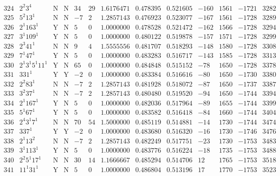 \documentclass[11pt,reqno,a4letter]{article}
\numberwithin{equation}{section}
\numberwithin{figure}{section}
\numberwithin{table}{section}
\theoremstyle{plain}
\numberwithin{theorem}{section}
\theoremstyle{definition}
\begin{document}
\begin{table}[ht]
\begin{equation*}
{\begin{array}{cc|cc|ccc|cc|cccc}
 324 & 2^2 3^4 & \text{N} & \text{N} & 34 & 29 & 1.6176471 & 0.478395 & 0.521605 & -160 & 1561 & -1721 & 3282 \\
 325 & 5^2 13^1 & \text{N} & \text{N} & -7 & 2 & 1.2857143 & 0.476923 & 0.523077 & -167 & 1561 & -1728 & 3289 \\
 326 & 2^1 163^1 & \text{Y} & \text{N} & 5 & 0 & 1.0000000 & 0.478528 & 0.521472 & -162 & 1566 & -1728 & 3294 \\
 327 & 3^1 109^1 & \text{Y} & \text{N} & 5 & 0 & 1.0000000 & 0.480122 & 0.519878 & -157 & 1571 & -1728 & 3299 \\
 328 & 2^3 41^1 & \text{N} & \text{N} & 9 & 4 & 1.5555556 & 0.481707 & 0.518293 & -148 & 1580 & -1728 & 3308 \\
 329 & 7^1 47^1 & \text{Y} & \text{N} & 5 & 0 & 1.0000000 & 0.483283 & 0.516717 & -143 & 1585 & -1728 & 3313 \\
 330 & 2^1 3^1 5^1 11^1 & \text{Y} & \text{N} & 65 & 0 & 1.0000000 & 0.484848 & 0.515152 & -78 & 1650 & -1728 & 3378 \\
 331 & 331^1 & \text{Y} & \text{Y} & -2 & 0 & 1.0000000 & 0.483384 & 0.516616 & -80 & 1650 & -1730 & 3380 \\
 332 & 2^2 83^1 & \text{N} & \text{N} & -7 & 2 & 1.2857143 & 0.481928 & 0.518072 & -87 & 1650 & -1737 & 3387 \\
 333 & 3^2 37^1 & \text{N} & \text{N} & -7 & 2 & 1.2857143 & 0.480480 & 0.519520 & -94 & 1650 & -1744 & 3394 \\
 334 & 2^1 167^1 & \text{Y} & \text{N} & 5 & 0 & 1.0000000 & 0.482036 & 0.517964 & -89 & 1655 & -1744 & 3399 \\
 335 & 5^1 67^1 & \text{Y} & \text{N} & 5 & 0 & 1.0000000 & 0.483582 & 0.516418 & -84 & 1660 & -1744 & 3404 \\
 336 & 2^4 3^1 7^1 & \text{N} & \text{N} & 70 & 54 & 1.5000000 & 0.485119 & 0.514881 & -14 & 1730 & -1744 & 3474 \\
 337 & 337^1 & \text{Y} & \text{Y} & -2 & 0 & 1.0000000 & 0.483680 & 0.516320 & -16 & 1730 & -1746 & 3476 \\
 338 & 2^1 13^2 & \text{N} & \text{N} & -7 & 2 & 1.2857143 & 0.482249 & 0.517751 & -23 & 1730 & -1753 & 3483 \\
 339 & 3^1 113^1 & \text{Y} & \text{N} & 5 & 0 & 1.0000000 & 0.483776 & 0.516224 & -18 & 1735 & -1753 & 3488 \\
 340 & 2^2 5^1 17^1 & \text{N} & \text{N} & 30 & 14 & 1.1666667 & 0.485294 & 0.514706 & 12 & 1765 & -1753 & 3518 \\
 341 & 11^1 31^1 & \text{Y} & \text{N} & 5 & 0 & 1.0000000 & 0.486804 & 0.513196 & 17 & 1770 & -1753 & 3523 \\

\end{array}}
\end{equation*}
\end{table}
\end{document}
